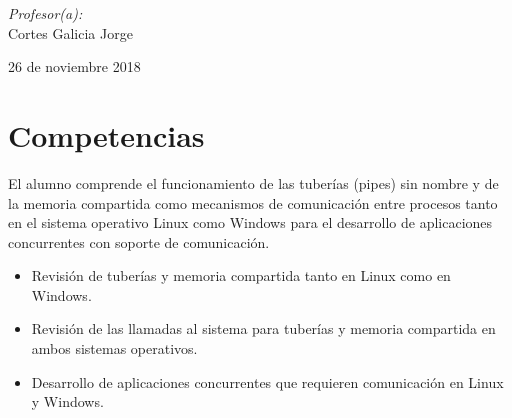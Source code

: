 \documentclass[12pt]{article}
\begin{document}
\begin{titlepage}
\begin{center}
\begin{minipage}{0.5\textwidth}
\begin{flushleft}
\begin{tabular}{ll}
          \end{tabular}
          \end{flushleft}
        \end{minipage}%
        \begin{minipage}{0.5\textwidth}
          \begin{flushright} \large
            \emph{Profesor(a):} \\
            Cortes Galicia Jorge  \\
          \end{flushright}
        \end{minipage}
        
        \vfill
        
        {\large 26 de noviembre 2018}
      \end{center}
    \end{titlepage}
  
  \tableofcontents
  \newpage
  
  

  \section{Competencias}
  El alumno comprende el funcionamiento de las tuberías (pipes) sin nombre y de la memoria compartida como mecanismos de comunicación entre procesos tanto en el sistema operativo Linux como Windows para el desarrollo de aplicaciones concurrentes con soporte de comunicación.
  \begin{itemize}
      \item Revisión de tuberías y memoria compartida tanto en Linux como en Windows.
        \item Revisión de las llamadas al sistema para tuberías y memoria compartida en ambos sistemas operativos.
        \item Desarrollo de aplicaciones concurrentes que requieren comunicación en Linux y Windows.
  \end{itemize}

\end{document}
